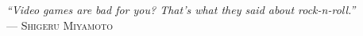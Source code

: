 



\begin{flushright}
\mbox{}\vfill
{\sffamily\itshape
``Video games are bad for you? That's what they said about rock-n-roll.''\\}
--- \textsc{Shigeru Miyamoto}
\end{flushright}



\listoffigures

\listoftables




\tableofcontents

